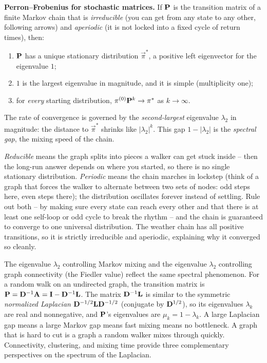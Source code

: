 \begin{formalbox}
\textbf{Perron--Frobenius for stochastic matrices.} If $\mathbf{P}$ is the transition matrix of
a finite Markov chain that is \emph{irreducible} (you can get from any state to any other,
following arrows) and \emph{aperiodic} (it is not locked into a fixed cycle of return
times), then:
\begin{enumerate}
\item $\mathbf{P}$ has a unique stationary distribution $\vec\pi^\ast$, a positive left
eigenvector for the eigenvalue $1$;
\item $1$ is the largest eigenvalue in magnitude, and it is simple (multiplicity one);
\item for \emph{every} starting distribution, $\mathbf{\pi}^{(0)}\mathbf{P}^k \to \mathbf{\pi}^\ast$ as
$k \to \infty$.
\end{enumerate}
The rate of convergence is governed by the \emph{second-largest} eigenvalue $\lambda_2$ in
magnitude: the distance to $\vec\pi^\ast$ shrinks like $|\lambda_2|^k$. This gap
$1 - |\lambda_2|$ is the \emph{spectral gap}, the mixing speed of the chain.
\end{formalbox}

\begin{intuitionbox}
\emph{Reducible} means the graph splits into pieces a walker can get stuck inside -- then
the long-run answer depends on where you started, so there is no single stationary
distribution. \emph{Periodic} means the chain marches in lockstep (think of a graph that forces the walker to alternate between two sets of nodes: odd steps here, even steps there); the distribution oscillates forever instead of settling.
Rule out both -- by making sure every state can reach every other and that there is at least
one self-loop or odd cycle to break the rhythm -- and the chain is guaranteed to converge to
one universal distribution. The weather chain has all positive transitions, so it is
strictly irreducible and aperiodic, explaining why it converged so cleanly.
\end{intuitionbox}

\begin{connectionbox}
The eigenvalue $\lambda_2$ controlling Markov mixing and the eigenvalue $\lambda_2$
controlling graph connectivity (the Fiedler value) reflect the same spectral phenomenon.
For a random walk on an undirected graph, the transition matrix is
$\mathbf{P} = \mathbf{D}^{-1}\mathbf{A} = \mathbf{I}-\mathbf{D}^{-1}\mathbf{L}$. The matrix $\mathbf{D}^{-1}\mathbf{L}$ is
similar to the symmetric \emph{normalized Laplacian}
$\mathbf{D}^{-1/2}\mathbf{L}\mathbf{D}^{-1/2}$ (conjugate by $\mathbf{D}^{1/2}$), so its eigenvalues
$\lambda_k$ are real and nonnegative, and $\mathbf{P}$'s eigenvalues are $\mu_k = 1 - \lambda_k$. A large Laplacian gap means a large
Markov gap means fast mixing means no bottleneck. A graph that is hard to cut is a graph a
random walker mixes through quickly. Connectivity, clustering, and mixing time provide three
complementary perspectives on the spectrum of the Laplacian.
\end{connectionbox}

